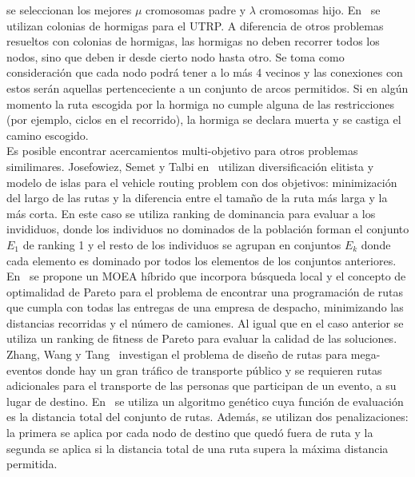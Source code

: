 \documentclass{llncs}
\begin{document}
se seleccionan los mejores $\mu$ cromosomas padre y $\lambda$ cromosomas hijo.
En~\cite{jiang2010improved} se utilizan colonias de hormigas para el UTRP. A diferencia de otros problemas resueltos con colonias de
hormigas, las hormigas no deben recorrer todos los nodos, sino que deben ir desde cierto nodo hasta otro.
Se toma como consideraci\'on que cada nodo podr\'a tener a lo m\'as 4 vecinos y las conexiones con estos ser\'an aquellas pertenceciente a
un conjunto de arcos permitidos. Si en alg\'un momento la ruta escogida por la hormiga no cumple
alguna de las restricciones (por ejemplo, ciclos en el recorrido), la hormiga se declara muerta y se castiga el
camino escogido.\\

Es posible encontrar acercamientos multi-objetivo para otros problemas similimares. Josefowiez, Semet y Talbi
en~\cite{vrprb} utilizan diversificaci\'on elitista y modelo de islas para el vehicle routing problem con
dos objetivos: minimizaci\'on del largo de las rutas y la diferencia entre el tama\~no de la ruta m\'as larga y la m\'as corta.
En este caso se utiliza ranking de dominancia para evaluar a los invididuos, donde los individuos no dominados de la poblaci\'on
forman el conjunto $E_1$ de ranking 1 y el resto de los individuos se agrupan en conjuntos $E_k$ donde cada elemento es dominado
por todos los elementos de los conjuntos anteriores.
En~\cite{ttvrp} se propone un MOEA h\'ibrido que incorpora b\'usqueda local y el concepto de optimalidad de Pareto para el
problema de encontrar una programaci\'on de rutas que cumpla con todas las entregas de una empresa de despacho, minimizando las distancias
recorridas y el n\'umero de camiones. Al igual que en el caso anterior se utiliza un ranking de fitness de Pareto para evaluar la calidad
de las soluciones. Zhang, Wang y Tang~\cite{events} investigan el problema de dise\~no de rutas para mega-eventos donde hay un gran
tr\'afico de transporte p\'ublico y se requieren rutas adicionales para el transporte de las personas que participan de un evento,
a su lugar de destino. En~\cite{events} se utiliza un algoritmo gen\'etico cuya funci\'on de evaluaci\'on es la distancia total del
conjunto de rutas. Adem\'as, se utilizan dos penalizaciones: la primera se aplica por cada nodo de destino que qued\'o fuera de ruta y
la segunda se aplica si la distancia total de una ruta supera la m\'axima distancia permitida.\\
\end{document}
